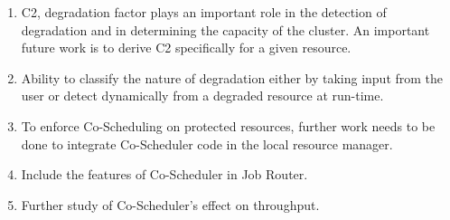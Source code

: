 \documentclass[ms,electronic,double]{nuthesis}
\begin{document}
\begin{enumerate}
  \item{C2, degradation factor plays an important role in the detection of degradation and in determining the capacity of the cluster. An important future
  work is to derive C2 specifically for a given resource.}
  \item{Ability to classify the nature of degradation either by taking input from the user or detect dynamically from a degraded resource at run-time.}
  \item{To enforce Co-Scheduling on protected resources, further work needs to be done to integrate Co-Scheduler code  in the local resource manager.}
  \item{Include the features of Co-Scheduler in Job Router.}
  \item{Further study of Co-Scheduler's effect on throughput.}
\end{enumerate}

\backmatter

\appendix




\nocite{*}

\end{document}
